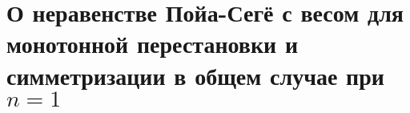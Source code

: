 \chapter{О неравенстве Пойа-Сегё с весом для монотонной перестановки и симметризации в общем случае при $n = 1$}
\label{chapt:unbounded}







